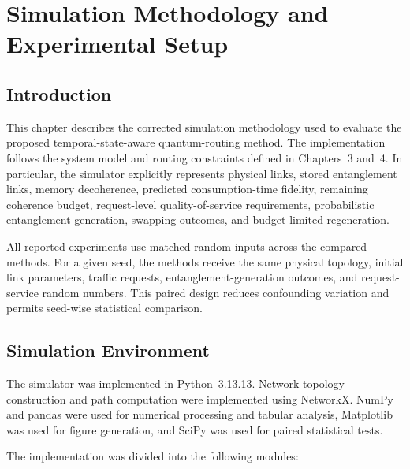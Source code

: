 \chapter{Simulation Methodology and Experimental Setup}
\label{chap:simulation_setup}

\section{Introduction}

This chapter describes the corrected simulation methodology used to evaluate the
proposed temporal-state-aware quantum-routing method. The implementation follows
the system model and routing constraints defined in Chapters~3 and~4. In
particular, the simulator explicitly represents physical links, stored
entanglement links, memory decoherence, predicted consumption-time fidelity,
remaining coherence budget, request-level quality-of-service requirements,
probabilistic entanglement generation, swapping outcomes, and budget-limited
regeneration.

All reported experiments use matched random inputs across the compared methods.
For a given seed, the methods receive the same physical topology, initial link
parameters, traffic requests, entanglement-generation outcomes, and
request-service random numbers. This paired design reduces confounding variation
and permits seed-wise statistical comparison.

\section{Simulation Environment}

The simulator was implemented in Python~3.13.13. Network topology construction
and path computation were implemented using NetworkX. NumPy and pandas were used
for numerical processing and tabular analysis, Matplotlib was used for figure
generation, and SciPy was used for paired statistical tests.

The implementation was divided into the following modules:

